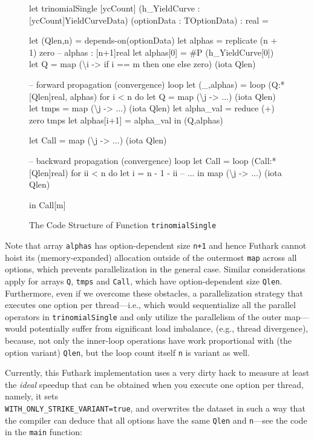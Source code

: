 \documentclass[a4paper,11pt]{article}
\begin{document}
\begin{figure}[h]
\begin{fancycode}[frame=lines]
let trinomialSingle [ycCount] (h_YieldCurve : [ycCount]YieldCurveData)
                              (optionData : TOptionData) : real =
    
    let (Qlen,n) = depends-on(optionData)
    let alphas = replicate (n + 1) zero  -- alphas : [n+1]real
    let alphas[0] = #P (h_YieldCurve[0])
    let Q = map (\textbackslash{}i -> if i == m then one else zero) (iota Qlen)

    -- forward propagation (convergence) loop
    let (_,alphas) =
        loop (Q:*[Qlen]real, alphas) for i < n do
            let Q         = map (\textbackslash{}j -> ...) (iota Qlen)
            let tmps      = map (\textbackslash{}j -> ...) (iota Qlen)
            let alpha_val = reduce (+) zero tmps
            let alphas[i+1] = alpha_val
            in  (Q,alphas)

    let Call = map (\textbackslash{}j -> ...) (iota Qlen)

    -- backward propagation (convergence) loop
    let Call =
        loop (Call:*[Qlen]real) for ii < n do
            let i = n - 1 - ii
            -- ...      
            in map (\textbackslash{}j -> ...) (iota Qlen)

    in Call[m]
\end{fancycode}
\vspace*{-3ex}
\caption{The Code Structure of Function {\tt trinomialSingle}}
\label{fig:code-struct} 
\end{figure}

Note that array {\tt alphas} has option-dependent size {\tt n+1}
and hence Futhark cannot hoist its (memory-expanded) allocation
outside of the outermost {\tt map} across all options, which
prevents parallelization in the general case. Similar
considerations apply for arrays {\tt Q}, {\tt tmps} and {\tt Call},
which have option-dependent size {\tt Qlen}.
%
Furthermore, even if we overcome these obstacles, a parallelization
strategy that executes one option per thread---i.e., which would
sequentialize all the parallel operators in {\tt trinomialSingle}
and only utilize the parallelism of the outer map---would potentially 
suffer from significant load imbalance, (e.g., thread divergence), 
because, not only the inner-loop operations have work proportional
with (the option variant) {\tt Qlen}, but the loop count itself {\tt n} 
is variant as well.  

Currently, this Futhark implementation uses a very dirty hack to measure
at least the {\em ideal} speedup that can be obtained when you execute
one option per thread, namely, it sets\\ {\tt WITH\_ONLY\_STRIKE\_VARIANT=true},
and overwrites the dataset in such a way that the compiler can deduce that 
all options have the same {\tt Qlen} and {\tt n}---see the code in the 
{\tt main} function:
\end{document}
